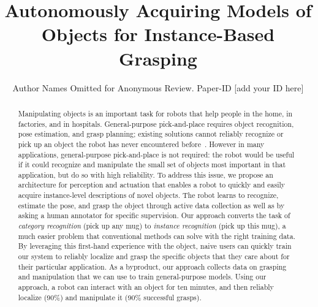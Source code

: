 \documentclass[conference]{IEEEtran}
\newcommand{\mytitle}[0]{Autonomously Acquiring Models of Objects for
  Instance-Based Grasping}
\begin{document}


\title{\mytitle{}}

\author{Author Names Omitted for Anonymous Review. Paper-ID [add your ID here]}

\maketitle


\begin{abstract}
Manipulating objects is an important task for robots that help people
in the home, in factories, and in hospitals.  General-purpose
pick-and-place requires object recognition, pose estimation, and grasp
planning; existing solutions cannot reliably recognize or pick up an
object the robot has never encountered before~\citep{}.  However in
many applications, general-purpose pick-and-place is not required: the
robot would be useful if it could recognize and manipulate the small
set of objects most important in that application, but do so with high
reliability.  To address this issue, we propose an architecture for
perception and actuation that enables a robot to quickly and easily
acquire instance-level descriptions of novel objects.  The robot
learns to recognize, estimate the pose, and grasp the object through
active data collection as well as by asking a human annotator for
specific supervision.  Our approach converts the task of {\em
  category recognition} (pick up any mug) to {\em instance
  recognition} (pick up this mug), a much easier problem that conventional
methods can solve with the right training data.  By leveraging
this first-hand experience with the object, naive users can
quickly train our system to reliably localize and grasp the specific
objects that they care about for their particular application.
As a byproduct, our approach collects data on grasping and
manipulation that we can use to train general-purpose models. Using
our approach, a robot can interact with an object for ten minutes, and
then reliably localize (90\%) and manipulate it (90\% successful
grasps).


\end{abstract}
\end{document}
